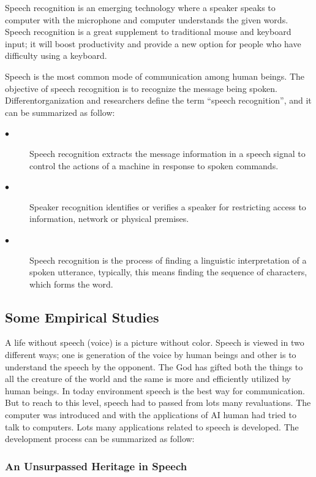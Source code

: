 \documentclass[12pt,a4paper,oldfontcommands]{memoir}
\begin{document}
Speech recognition is an emerging technology where a speaker speaks to computer
with the microphone and computer understands the given words. Speech recognition
is a great supplement to traditional mouse and keyboard input; it will boost
productivity and provide a new option for people who have difficulty using a
keyboard\cite{21}.

Speech is the most common mode of communication among human beings. The
objective of speech recognition is to recognize the message being spoken. Differentorganization and researchers define the term “speech recognition”, and it can be summarized as follow:
\begin{description}
\item[$\bullet$] Speech recognition extracts the message information in a speech signal to control the
actions of a machine in response to spoken commands\cite{22}.
\item[$\bullet$]Speaker recognition identifies or verifies a speaker for restricting access to
information, network or physical premises\cite{22}.
\item[$\bullet$]Speech recognition is the process of finding a linguistic interpretation of a spoken
utterance, typically, this means finding the sequence of characters, which forms the
word.
\end{description}

\subsection{Some Empirical Studies}
A life without speech (voice) is a picture without color. Speech is viewed in two
different ways; one is generation of the voice by human beings and other is to
understand the speech by the opponent. The God has gifted both the things to all the
creature of the world and the same is more and efficiently utilized by human beings.
In today environment speech is the best way for communication. But to reach to this
level, speech had to passed from lots many revaluations. The computer was
introduced and with the applications of AI human had tried to talk to computers. Lots
many applications related to speech is developed. The development process can be
summarized as follow:

\subsubsection{An Unsurpassed Heritage in Speech}
\end{document}

